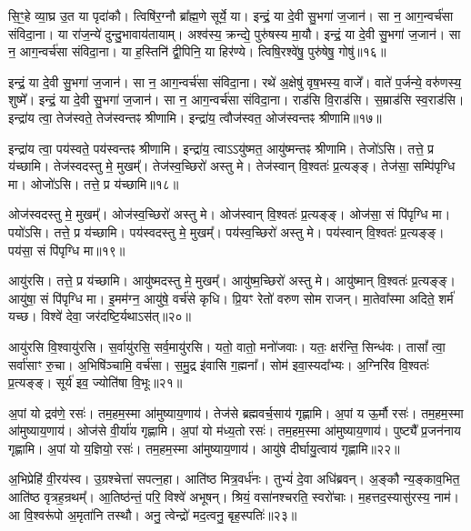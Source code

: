 सि॒ꣳ॒हे व्या॒घ्र उ॒त या पृदा॑कौ।
त्विषि॑र॒ग्नौ ब्रा᳚ह्म॒णे सूर्ये॒ या।
इन्द्रं॒ या दे॒वी सु॒भगा॑ ज॒जान॑।
सा न॒ आग॒न्वर्च॑सा संविदा॒ना।
या रा॑ज॒न्ये॑ दुन्दु॒भावाय॑तायाम्।
अश्व॑स्य॒ क्रन्द्ये॒ पुरु॑षस्य मा॒यौ।
इन्द्रं॒ या दे॒वी सु॒भगा॑ ज॒जान॑।
सा न॒ आग॒न्वर्च॑सा संविदा॒ना।
या ह॒स्तिनि॑ द्वी॒पिनि॒ या हिर॑ण्ये।
त्विषि॒रश्वे॑षु॒ पुरु॑षेषु॒ गोषु॑॥१६॥\ip

इन्द्रं॒ या दे॒वी सु॒भगा॑ ज॒जान॑।
सा न॒ आग॒न्वर्च॑सा संविदा॒ना।
रथे॑ अ॒क्षेषु॑ वृष॒भस्य॒ वाजे᳚।
वाते॑ प॒र्जन्ये॒ वरु॑णस्य॒ शुष्मे᳚।
इन्द्रं॒ या दे॒वी सु॒भगा॑ ज॒जान॑।
सा न॒ आग॒न्वर्च॑सा संविदा॒ना।
राड॑सि वि॒राड॑सि।
स॒म्राड॑सि स्व॒राड॑सि।
इन्द्रा॑य त्वा॒ तेज॑स्वते॒ तेज॑स्वन्तꣴ श्रीणामि।
इन्द्रा॑य॒ त्वौज॑स्वत॒ ओज॑स्वन्तꣴ श्रीणामि॥१७॥\ip

इन्द्रा॑य त्वा॒ पय॑स्वते॒ पय॑स्वन्तꣴ श्रीणामि।
इन्द्रा॑य॒ त्वा\-ऽऽयु॑ष्मत॒ आयु॑ष्मन्तꣴ श्रीणामि।
तेजो॑ऽसि।
तत्ते॒ प्र य॑च्छामि।
तेज॑स्वदस्तु मे॒ मुखम्᳚।
तेज॑स्व॒च्छिरो॑ अस्तु मे।
तेज॑स्वान् वि॒श्वतः॑ प्र॒त्यङ्ङ्।
तेज॑सा॒ सम्पि॑पृग्धि मा।
ओजो॑ऽसि।
तत्ते॒ प्र य॑च्छामि॥१८॥\ip

ओज॑स्वदस्तु मे॒ मुखम्᳚।
ओज॑स्व॒च्छिरो॑ अस्तु मे।
ओज॑स्वान् वि॒श्वतः॑ प्र॒त्यङ्ङ्।
ओज॑सा॒ सं पि॑पृग्धि मा।
पयो॑ऽसि।
तत्ते॒ प्र य॑च्छामि।
पय॑स्वदस्तु मे॒ मुखम्᳚।
पय॑स्व॒च्छिरो॑ अस्तु मे।
पय॑स्वान् वि॒श्वतः॑ प्र॒त्यङ्ङ्।
पय॑सा॒ सं पि॑पृग्धि मा॥१९॥\ip

आयु॑रसि।
तत्ते॒ प्र य॑च्छामि।
आयु॑ष्मदस्तु मे॒ मुखम्᳚।
आयु॑ष्म॒च्छिरो॑ अस्तु मे।
आयु॑ष्मान् वि॒श्वतः॑ प्र॒त्यङ्ङ्।
आयु॑षा॒ सं पि॑पृग्धि मा।
इ॒मम॑ग्न॒ आयु॑षे॒ वर्च॑से कृधि।
प्रि॒यꣳ रेतो॑ वरुण सोम राजन्।
मा॒तेवा᳚स्मा अदिते॒ शर्म॑ यच्छ।
विश्वे॑ देवा॒ जर॑दष्टि॒र्यथा\-ऽस॑त्॥२०॥\ip

आयु॑रसि वि॒श्वायु॑रसि।
स॒र्वायु॑रसि॒ सर्व॒मायु॑रसि।
यतो॒ वातो॒ मनो॑जवाः।
यतः॒ क्षर॑न्ति॒ सिन्ध॑वः।
तासां᳚ त्वा॒ सर्वा॑साꣳ रु॒चा।
अ॒भिषि॑ञ्चामि॒ वर्च॑सा।
स॒मु॒द्र इ॑वासि ग॒ह्मना᳚।
सोम॑ इवा॒स्यदा᳚भ्यः।
अ॒ग्निरि॑व वि॒श्वतः॑ प्र॒त्यङ्ङ्।
सूर्य॑ इव॒ ज्योति॑षा वि॒भूः॥२१॥\ip

अ॒पां यो द्रव॑णे॒ रसः॑।
तम॒हम॒स्मा आ॑मुष्याय॒णाय॑।
तेज॑से ब्रह्म\-वर्च॒साय॑ गृह्णामि।
अ॒पां य ऊ॒र्मौ रसः॑।
तम॒हम॒स्मा आ॑\-मुष्या\-य॒णाय॑।
ओज॑से वी॒र्या॑य गृह्णामि।
अ॒पां यो म॑ध्य॒तो रसः॑।
तम॒\-ह\-म॒स्मा आ॑मुष्याय॒णाय॑।
पुष्ट्यै᳚ प्र॒जन॑नाय गृह्णामि।
अ॒पां यो य॒ज्ञियो॒ रसः॑।
तम॒हम॒स्मा आ॑मुष्याय॒णाय॑।
आयु॑षे दीर्घायु॒त्वाय॑ गृह्णामि॥२२॥\ip\anuvakamend[गोष्वोज॑स्वन्तꣴ श्रीणा॒म्योजो॑ऽसि॒ तत्ते॒ प्रय॑च्छामि॒ पय॑सा॒ सम्पि॑पृग्धि॒ माऽस॑द्वि॒भूर्य॒ज्ञियो॒ रसो॒ द्वे च॑]

अ॒भिप्रेहि॑ वी॒रय॑स्व।
उ॒ग्रश्चेत्ता॑ सपत्न॒हा।
आति॑ष्ठ मित्र॒वर्ध॑नः।
तुभ्यं॑ दे॒वा अधि॑ब्रवन्।
अ॒ङ्कौ न्य॒ङ्काव॒भित॒ आति॑ष्ठ वृत्रह॒न्रथम्᳚।
आ॒तिष्ठ॑न्तं॒ परि॒ विश्वे॑ अभूषन्।
श्रियं॒ वसा॑नश्चरति॒ स्वरो॑चाः।
म॒हत्तद॒स्यासु॑रस्य॒ नाम॑।
आ वि॒श्वरू॑पो अ॒मृता॑नि तस्थौ।
अनु॒ त्वेन्द्रो॑ मद॒त्वनु॒ बृह॒स्पतिः॑॥२३॥\ip

